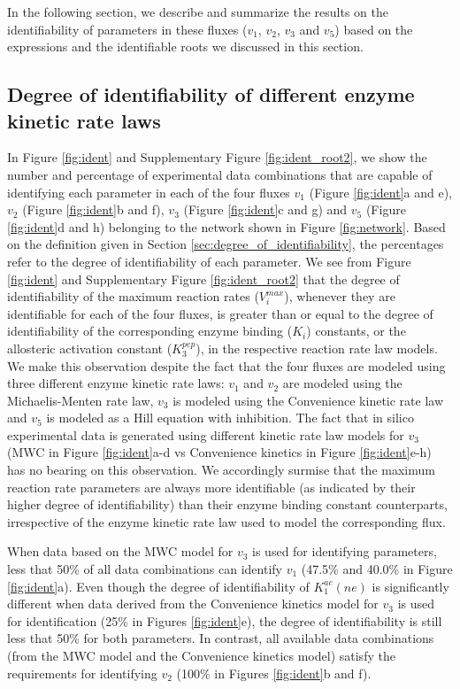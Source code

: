 \documentclass[10pt]{article}
\begin{document}
	In the following section, we describe and summarize the results on the identifiability of parameters in these fluxes ($v_1$, $v_2$, $v_3$ and $v_5$) based on the expressions and the identifiable roots we discussed in this section.
	
	\subsection{Degree of identifiability of different enzyme kinetic rate laws}\label{sec:ident_rate_laws}		
	In Figure \ref{fig:ident} and Supplementary Figure \ref{fig:ident_root2}, we show the number and percentage of experimental data combinations that are capable of identifying each parameter in each of the four fluxes $v_1$ (Figure \ref{fig:ident}a and e), $v_2$ (Figure \ref{fig:ident}b and f), $v_3$ (Figure \ref{fig:ident}c and g) and $v_5$ (Figure \ref{fig:ident}d and h) belonging to the network shown in Figure \ref{fig:network}. Based on the definition given in Section \ref{sec:degree_of_identifiability}, the percentages refer to the degree of identifiability of each parameter. We see from Figure \ref{fig:ident} and Supplementary Figure \ref{fig:ident_root2} that the degree of identifiability of the maximum reaction rates ($V_i^{max}$), whenever they are identifiable for each of the four fluxes, is greater than or equal to the degree of identifiability of the corresponding enzyme binding ($K_i$) constants, or the allosteric activation constant ($K_3^{pep}$), in the respective reaction rate law models. We make this observation despite the fact that the four fluxes are modeled using three different enzyme kinetic rate laws: $v_1$ and $v_2$ are modeled using the Michaelis-Menten rate law, $v_3$ is modeled using the Convenience kinetic rate law and $v_5$ is modeled as a Hill equation with inhibition. The fact that in silico experimental data is generated using different kinetic rate law models for $v_3$ (MWC in Figure \ref{fig:ident}a-d vs Convenience kinetics in Figure \ref{fig:ident}e-h) has no bearing on this observation. We accordingly surmise that the maximum reaction rate parameters are always more identifiable (as indicated by their higher degree of identifiability) than their enzyme binding constant counterparts, irrespective of the enzyme kinetic rate law used to model the corresponding flux.
	
	When data based on the MWC model for $v_3$ is used for identifying parameters, less that 50\% of all data combinations can identify $v_1$ (47.5\% and 40.0\% in Figure \ref{fig:ident}a). Even though the degree of identifiability of $K_1^{ac}(ne)$ is significantly different when data derived from the Convenience kinetics model for $v_3$ is used for identification (25\% in Figures \ref{fig:ident}e), the degree of identifiability is still less that 50\% for both parameters. In contrast, all available data combinations (from the MWC model and the Convenience kinetics model) satisfy the requirements for identifying $v_2$ (100\% in Figures \ref{fig:ident}b and f).
	
\end{document}
